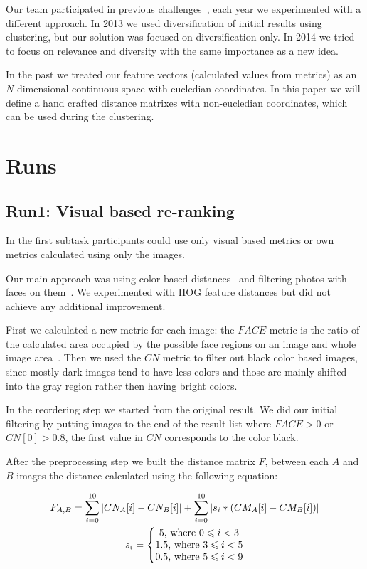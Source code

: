 \documentclass{sig-alternate}
\begin{document}
Our team participated in previous challenges~\cite{szHucs2013bmemtm,Paroczi2014}, each year we experimented with a different approach. In 2013 we used diversification of initial results using clustering, but our solution was focused on diversification only. In 2014 we tried to focus on relevance and diversity with the same importance as a new idea.

In the past we treated our feature vectors (calculated values from metrics) as an $N$ dimensional continuous space with eucledian coordinates. In this paper we will define a hand crafted distance matrixes with non-eucledian coordinates, which can be used during the clustering. 

\section{Runs}

\subsection{Run1: Visual based re-ranking}
In the first subtask participants could use only visual based metrics or own metrics calculated using only the images.

Our main approach was using color based distances~\cite{Datta2008} and filtering photos with faces on them~\cite{szHucs2013bmemtm,Paroczi2014}. We experimented with HOG feature distances but did not achieve any additional improvement.

First we calculated a new metric for each image: the $FACE$ metric is the ratio of the calculated area occupied by the possible face regions on an image and whole
image area~\cite{szHucs2013bmemtm}. Then we used the $CN$ metric to filter out black color based images, since mostly dark images tend to have less colors and those are mainly shifted into the gray region rather then having bright colors.

In the reordering step we started from the original result. We did our initial filtering by putting images to the end of the result list where $FACE>0$ or $CN[0]>0.8$, the first value in $CN$ corresponds to the color black.

After the preprocessing step we built the distance matrix $F$, between each $A$ and $B$ images the distance calculated using the following equation:

\begin{gather*} 
F_{A,B} = \sum_{i=0}^{10}  \left | CN_{A}[i]-CN_{B}[i] \right | +\sum_{i=0}^{10} \left | s_i * (CM_{A}[i]-CM_{B}[i]) \right |\\
s_i = \left\{\begin{matrix}
5 \textup{, where }0 \leqslant  i < 3\\ 
1.5 \textup{, where }3 \leqslant  i < 5\\ 
0.5 \textup{, where }5 \leqslant  i < 9
\end{matrix}\right.
\end{gather*}
\end{document}
